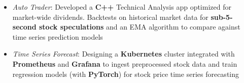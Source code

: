 \begin{itemize}
  \item \textit{Auto Trader}: Developed a \textbf{C++} Technical Analysis app optimized for market-wide dividends. Backtests on historical market data for \textbf{sub-5-second stock speculations} and an EMA algorithm to compare against time series prediction models
  \item \textit{Time Series Forecast}: Designing a \textbf{Kubernetes} cluster integrated with \textbf{Prometheus} and \textbf{Grafana} to ingest preprocessed stock data and train regression models (with \textbf{PyTorch}) for stock price time series forecasting
\end{itemize}